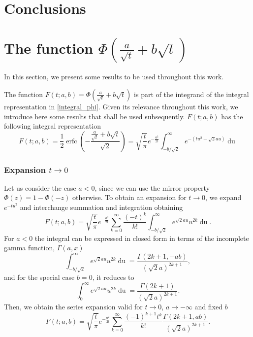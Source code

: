 \documentclass[10pt,a4paper,oneside]{article}
\DeclareMathOperator{\erfc}{erfc}
\numberwithin{equation}{section}
\begin{document}
\section{Conclusions}

\appendix
\section{The function $\Phi\left(\frac{a}{\sqrt{t}} + b\sqrt{t}\right)$}
In this section, we present some results to be used throughout this work.

The function $F(t; a, b) = \Phi\left(\frac{a}{\sqrt{t}} + b\sqrt{t}\right)$ is part of the integrand of the integral representation in \eqref{integral_phi}. Given its relevance throughout this work, we introduce here some results that shall be used subsequently. $F(t; a, b)$ has the following integral representation \cite[\S 7.7.6]{NIST:DLMF}
\begin{equation}\label{integral_erfc_ab}
F(t; a, b) = \frac{1}{2}\erfc\left(-\frac{\frac{a}{\sqrt{t}} + b\sqrt{t}}{\sqrt{2}}\right)  = \sqrt{\frac{t}{\pi}} e^{-\frac{a^2}{2t}} \int_{-b/\sqrt{2}}^{\infty} e^{-(tu^2 - \sqrt{2}au)} \mathop{du}
\end{equation}

\subsubsection{Expansion $t \to 0$}

Let us consider the case $a < 0$, since we can use the mirror property $\Phi(z) = 1 - \Phi(-z)$ otherwise. To obtain an expansion for $t \to 0$, we expand $e^{-tu^2}$ and interchange summation and integration obtaining
\begin{equation*}
F(t; a, b) = \sqrt{\frac{t}{\pi}} e^{-\frac{a^2}{2t}} \sum_{k=0}^{\infty} \frac{(-t)^k}{k!}\int_{-b/\sqrt{2}}^{\infty} e^{\sqrt{2}a u} u^{2k}\mathop{du}.
\end{equation*}
For $a < 0$ the integral can be expressed in closed form in terms of the incomplete gamma function, $\Gamma(a, x)$
\begin{equation*}
\int_{-b/\sqrt{2}}^{\infty} e^{\sqrt{2}a u} u^{2k}\mathop{du} = \frac{\Gamma(2k+1, -ab)}{(\sqrt{2}a)^{2k+1}},
\end{equation*}
and for the special case $b=0$, it reduces to
\begin{equation*}
\int_{0}^{\infty} e^{\sqrt{2}a u} u^{2k}\mathop{du} = \frac{\Gamma(2k+1)}{(\sqrt{2}a)^{2k+1}}.
\end{equation*}
Then, we obtain the series expansion valid for $t \to 0$, $a \to -\infty$ and fixed $b$
\begin{equation}
F(t; a, b) = \sqrt{\frac{t}{\pi}} e^{-\frac{a^2}{2t}} \sum_{k=0}^{\infty} \frac{(-1)^{k+1} t^k}{k!}\frac{\Gamma(2k + 1, ab)}{(\sqrt{2}a)^{2k+1}}.
\end{equation}
\end{document}
